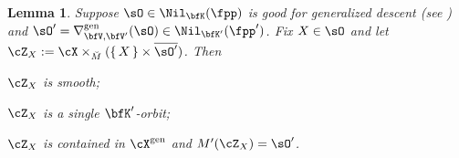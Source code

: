 \documentclass[12pt,a4paper]{amsart}
\def\gDD{\nabla^{\mathrm{gen}}}
\numberwithin{equation}{section}
\newtheorem{lem}[thm]{Lemma}
\theoremstyle{remark}
\def\Xg{\cX^{\mathrm{gen}}}
\def\ZX{\cZ_{X}}
\def\bsOp{\overline{\sO'}}
\begin{document}
\begin{lem}\label{lem:GDS.sh}
  Suppose $\sO\in \Nil_{\bfK}(\fpp)$ is good for generalized descent
  (see ) and
  $\sO' = \gDD_{\bfV,\bfV'}(\sO)\in \Nil_{\bfK'}(\fpp')$. Fix $X\in \sO$ and
  let $\ZX := \cX\times_{\dbM}(\set{X}\times\bsOp)$. Then
\begin{enumT}
\item\label{it:GDS.sh.2} $\ZX$ is smooth;
\item\label{it:GDS.sh.1} $\ZX$ is a single $\bfK'$-orbit;
\item\label{it:GDS.sh.3} $\ZX$ is contained in $\Xg$ and  $M'(\ZX) = \sO'$.

\end{enumT}
\end{lem}
\end{document}
